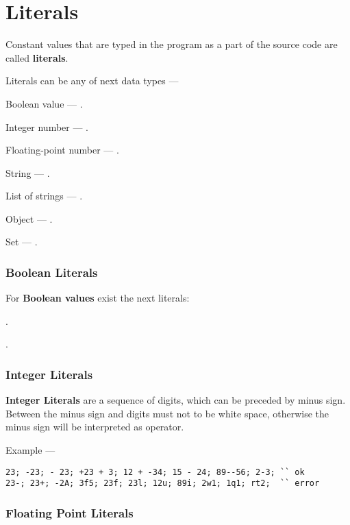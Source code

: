 \section{Literals}

Constant values that are typed in the program as a part of the source code are called {\bf literals}.

Literals can be any of next data types —

\begin{icItems}
	\item
		Boolean value — \bool{}.
	\item
		Integer number — \integer{}.
	\item
		Floating-point number — \double{}.
	\item
		String — \str{}.
	\item
		List of strings — \listtype{}.
	\item
		Object — \object{}.
	\item
		Set — \set{}.
\end{icItems}

\subsubsection{Boolean Literals}

For {\bf Boolean values} exist the next literals:
\begin{icItems}
	\item \true{}.
	\item \false{}.
\end{icItems}

\subsubsection{Integer Literals}

{\bf Integer Literals} are a sequence of digits, which can be preceded by minus sign. Between the minus sign and digits must not to be white space, otherwise the minus sign will be interpreted as operator.

Example —
\begin{verbatim}
23; -23; - 23; +23 + 3; 12 + -34; 15 - 24; 89--56; 2-3; `` ok
23-; 23+; -2A; 3f5; 23f; 23l; 12u; 89i; 2w1; 1q1; rt2;  `` error
\end{verbatim}

\subsubsection{Floating Point Literals}

